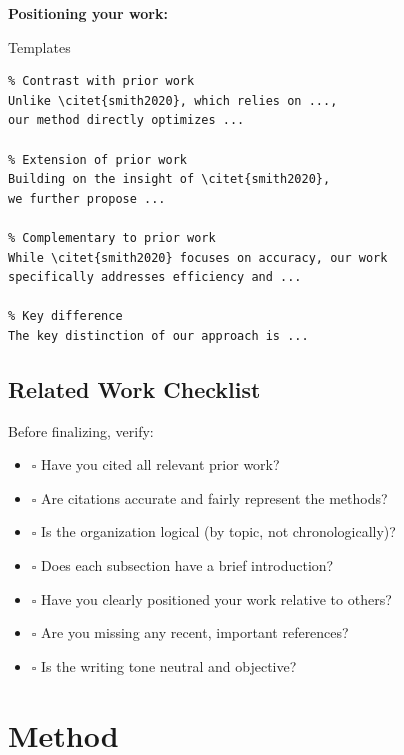 \documentclass[]{fairmeta} %
\theoremstyle{plain}
\theoremstyle{definition}
\theoremstyle{remark}
\begin{document}
\bigskip
\noindent\textbf{Positioning your work:}

\begin{promptbox}{Templates}
\begin{verbatim}
% Contrast with prior work
Unlike \citet{smith2020}, which relies on ...,
our method directly optimizes ...

% Extension of prior work
Building on the insight of \citet{smith2020},
we further propose ...

% Complementary to prior work
While \citet{smith2020} focuses on accuracy, our work
specifically addresses efficiency and ...

% Key difference
The key distinction of our approach is ...
\end{verbatim}
\end{promptbox}

\subsection{Related Work Checklist}
\label{sec:rw-checklist}

Before finalizing, verify:

\begin{itemize}
    \item[] $\square$ Have you cited all relevant prior work?
    \item[] $\square$ Are citations accurate and fairly represent the methods?
    \item[] $\square$ Is the organization logical (by topic, not chronologically)?
    \item[] $\square$ Does each subsection have a brief introduction?
    \item[] $\square$ Have you clearly positioned your work relative to others?
    \item[] $\square$ Are you missing any recent, important references?
    \item[] $\square$ Is the writing tone neutral and objective?
\end{itemize}


\section{Method}
\end{document}
